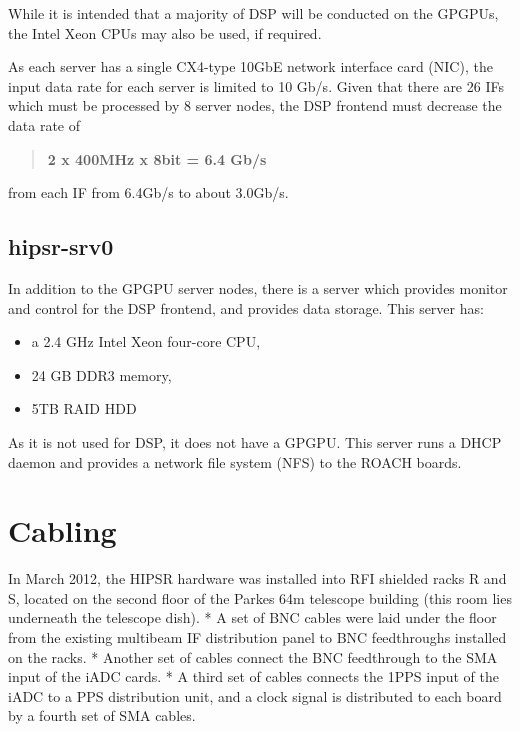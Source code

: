 \documentclass[letterpaper,10pt,english]{sphinxmanual}
\begin{document}
While it is intended that a majority of DSP will be conducted on the GPGPUs, the Intel Xeon CPUs may also be used, if required.

As each server has a single CX4-type 10GbE network interface card (NIC), the input data rate for each server is limited to 10 Gb/s. Given that there are 26 IFs which must be processed by 8 server nodes, the DSP frontend must decrease the data rate of
\begin{quote}

\textbf{2 x 400MHz x 8bit = 6.4 Gb/s}
\end{quote}

from each IF from 6.4Gb/s to about 3.0Gb/s.


\subsection{hipsr-srv0}
\label{hardware:hipsr-srv0}
In addition to the GPGPU server nodes, there is a server which provides monitor and control for the DSP frontend, and provides data storage. This server has:
\begin{itemize}
\item {} 
a 2.4 GHz Intel Xeon four-core CPU,

\item {} 
24 GB DDR3 memory,

\item {} 
5TB RAID HDD

\end{itemize}

As it is not used for DSP, it does not have a GPGPU. This server runs a DHCP daemon and provides a network file system (NFS) to the ROACH boards.


\section{Cabling}
\label{hardware:cabling}
In March 2012, the HIPSR hardware was installed into RFI shielded racks R and S, located on the second floor of the Parkes 64m telescope building (this room lies underneath the telescope dish).
* A set of BNC cables were laid under the floor from the existing multibeam IF distribution panel to BNC feedthroughs installed on the racks.
* Another set of cables connect the BNC feedthrough to the SMA input of the iADC cards.
* A third set of cables connects the 1PPS input of the iADC to a PPS distribution unit, and a clock signal is distributed to each board by a fourth set of SMA cables.
\end{document}
